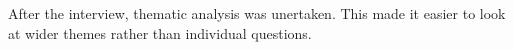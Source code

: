 After the interview, thematic analysis was unertaken. This made it easier to look at wider themes rather than individual questions. 